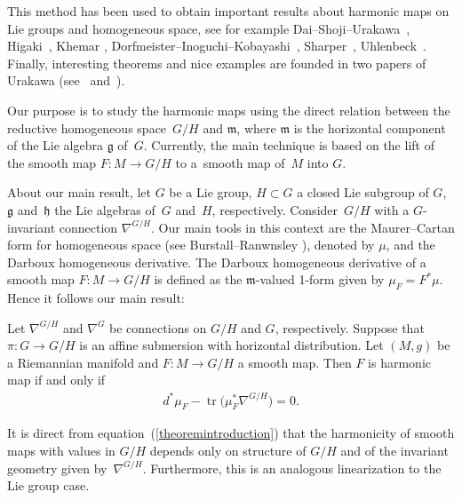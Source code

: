 \documentclass[pdftex]{sigma}
\numberwithin{equation}{section}
\newcommand{\m}{\mathfrak{m}}
\begin{document}
This method has been used to obtain important results about harmonic
maps on Lie groups and homogeneous space, see for example
Dai--Shoji--Urakawa~\cite{DaiY/ShojiM/UrakawaH}, Higaki~\cite{Higaki},
Khemar \cite{Khemar}, Dorf\-meis\-ter--Inoguchi--Kobayashi~\cite{DorfmeisterJ/InoguchiJ/KobayashiS}, Sharper~\cite{Sharpe},
Uhlenbeck~\cite{Uhlenbeck}. Finally, interesting theorems and nice
examples are founded in   two papers of Urakawa (see~\cite{Urakawa2}
and~\cite{Urakawa3}).

Our purpose is to study the harmonic maps using the direct relation between the reductive homogeneous space~$G/H$ and ${\mathfrak m}$, where
${\mathfrak m}$ is the horizontal component of the Lie algebra ${\mathfrak g}$ of~$G$. Currently, the main technique is based on the lift
of the smooth map $F\colon M \rightarrow G/H$ to a~smooth map of~$M$ into $G$.

About our main result, let $G$ be a Lie group, $H\subset G$ a closed Lie subgroup of $G$, $\mathfrak{g}$ and~$\mathfrak{h}$ the Lie algebras of~$G$ and~$H$, respectively. Consider~$G/H$ with a $G$-invariant connection $\nabla^{G/H}$. Our main tools in this context are the Maurer--Cartan form for
homogeneous space (see Burstall--Ranwnsley \cite{BurstallF/RanwnsleyJ}), denoted by $\mu$, and the Darboux homogeneous derivative.  The Darboux homogeneous derivative of a smooth map $F\colon M \rightarrow G/H$ is def\/ined as the $\m$-valued 1-form given by $\mu_F  =F^*\mu$. Hence it follows our main result:

\begin{theorem*}
    Let $\nabla^{G/H}$ and $\nabla^{G}$ be connections on $G/H$ and $G$, respectively. Suppose that $\pi\colon  G \rightarrow G/H$ is an affine submersion with horizontal distribution. Let $(M,g)$ be a Riemannian manifold and $F\colon M \rightarrow G/H$ a smooth map. Then $F$ is harmonic map if and only if
    \begin{gather}\label{theoremintroduction}
      d^{*}\mu_{F}  - \operatorname{tr}\big(\mu_{F} ^* \nabla^{G/H}\big) = 0.
    \end{gather}
\end{theorem*}

It is direct from equation~(\ref{theoremintroduction}) that the
harmonicity of smooth maps with values in $G/H$ depends only on
structure of $G/H$ and of the invariant geometry given by~$\nabla^{G/H}$. Furthermore, this is an analogous linearization  to
the Lie group case.
\end{document}
